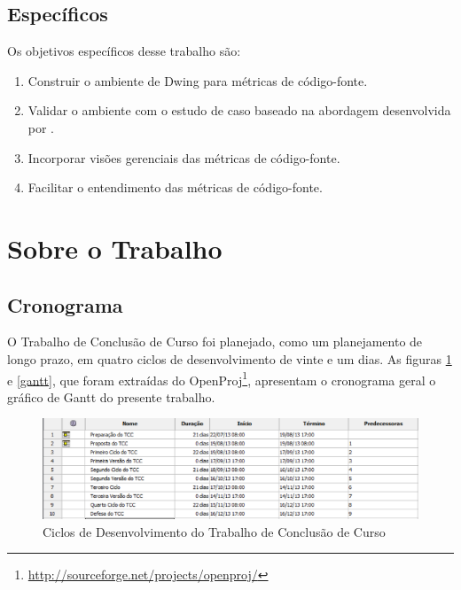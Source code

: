 
\subsection{Específicos}

Os objetivos específicos desse trabalho são:

\begin{enumerate}
	
\item Construir o ambiente de Dwing para métricas de código-fonte.
\item Validar o ambiente com o estudo de caso baseado na abordagem desenvolvida por .
\item Incorporar visões gerenciais das métricas de código-fonte.
\item Facilitar o entendimento das métricas de código-fonte.

\end{enumerate}


\section{Sobre o Trabalho}

\subsection{Cronograma}
O Trabalho de Conclusão de Curso foi planejado, como um planejamento de longo prazo, em quatro ciclos de desenvolvimento de vinte e um dias. As figuras \ref{cronograma} e \ref{gantt}, que foram extraídas do OpenProj\footnote{\url{http://sourceforge.net/projects/openproj/}}, apresentam o cronograma geral o gráfico de Gantt do presente trabalho.

	\begin{figure}[h]
		\centering
			\includegraphics[keepaspectratio=true,scale=0.7]{figuras/calendario_marcos.eps}
		\caption{Ciclos de Desenvolvimento do Trabalho de Conclusão de Curso}
		\label{cronograma}
	\end{figure}

